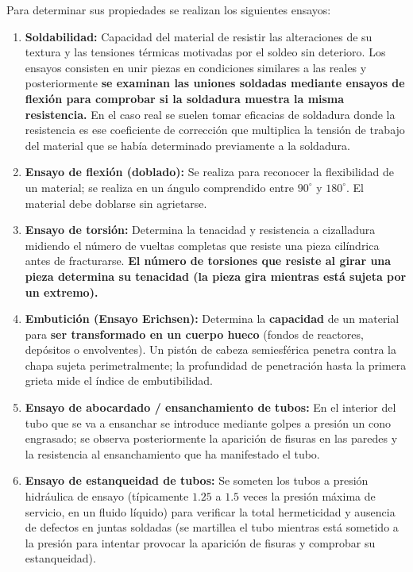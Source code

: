 Para determinar sus propiedades se realizan los siguientes ensayos:
\begin{enumerate}
    \item \textbf{Soldabilidad:} Capacidad del material de resistir las alteraciones de su textura y las tensiones térmicas motivadas por el soldeo sin deterioro. Los ensayos consisten en unir piezas en condiciones similares a las reales y posteriormente \textbf{se examinan las uniones soldadas mediante ensayos de flexión para comprobar si la soldadura muestra la misma resistencia.} En el caso real se suelen tomar eficacias de soldadura donde la resistencia es ese coeficiente de corrección que multiplica la tensión de trabajo del material que se había determinado previamente a la soldadura.
    \item \textbf{Ensayo de flexión (doblado):} Se realiza para reconocer la flexibilidad de un material; se realiza en un ángulo comprendido entre $90^\circ$ y $180^\circ$. El material debe doblarse sin agrietarse.
    \item \textbf{Ensayo de torsión:} Determina la tenacidad y resistencia a cizalladura midiendo el número de vueltas completas que resiste una pieza cilíndrica antes de fracturarse. \textbf{El número de torsiones que resiste al girar una pieza determina su tenacidad (la pieza gira mientras está sujeta por un extremo).}
    \item \textbf{Embutición (Ensayo Erichsen):} Determina la \textbf{capacidad} de un material para \textbf{ser transformado en un cuerpo hueco} (fondos de reactores, depósitos o envolventes). Un pistón de cabeza semiesférica penetra contra la chapa sujeta perimetralmente; la profundidad de penetración hasta la primera grieta mide el índice de embutibilidad.
    \item \textbf{Ensayo de abocardado / ensanchamiento de tubos:} En el interior del tubo que se va a ensanchar se introduce mediante golpes a presión un cono engrasado; se observa posteriormente la aparición de fisuras en las paredes y la resistencia al ensanchamiento que ha manifestado el tubo.
    \item \textbf{Ensayo de estanqueidad de tubos:} Se someten los tubos a presión hidráulica de ensayo (típicamente $1.25$ a $1.5$ veces la presión máxima de servicio, en un fluido líquido) para verificar la total hermeticidad y ausencia de defectos en juntas soldadas (se martillea el tubo mientras está sometido a la presión para intentar provocar la aparición de fisuras y comprobar su estanqueidad).
\end{enumerate}

